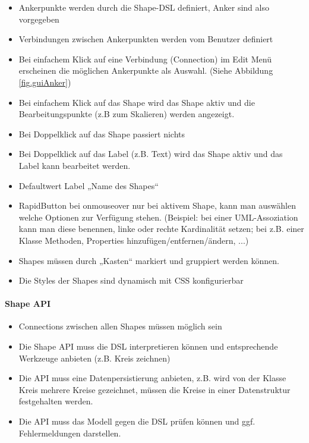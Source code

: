 \begin{itemize}
\begin{itemize}
    \end{itemize}
  \item Ankerpunkte werden durch die Shape-DSL definiert, Anker sind also vorgegeben
  \item Verbindungen zwischen Ankerpunkten werden vom Benutzer definiert
  \item Bei einfachem Klick auf eine Verbindung (Connection) im Edit Menü erscheinen die möglichen Ankerpunkte als Auswahl. (Siehe Abbildung \ref{fig.guiAnker})
  \item Bei einfachem Klick auf das Shape wird das Shape aktiv und die Bearbeitungspunkte (z.B zum Skalieren) werden angezeigt.
  \item Bei Doppelklick auf das Shape passiert nichts
  \item Bei Doppelklick auf das Label (z.B. Text) wird das Shape aktiv und das Label kann bearbeitet werden.
  \item Defaultwert Label „Name des Shapes“
  \item RapidButton bei onmouseover nur bei aktivem Shape, kann man auswählen welche Optionen zur Verfügung stehen. (Beispiel: bei einer UML-Assoziation kann man diese benennen, linke oder rechte Kardinalität setzen; bei z.B. einer Klasse Methoden, Properties hinzufügen/entfernen/ändern, ...)
  \item Shapes müssen durch „Kasten“ markiert und gruppiert werden können.
  \item Die Styles der Shapes sind dynamisch mit CSS konfigurierbar
\end{itemize}

\paragraph{Shape API}

\begin{itemize}
  \item Connections zwischen allen Shapes müssen möglich sein
  \item Die Shape API muss die DSL interpretieren können und entsprechende Werkzeuge anbieten (z.B. Kreis zeichnen)
  \item Die API muss eine Datenpersistierung anbieten, z.B. wird von der Klasse Kreis mehrere Kreise gezeichnet, müssen die Kreise in einer Datenstruktur festgehalten werden.
  \item Die API muss das Modell gegen die DSL prüfen können und ggf. Fehlermeldungen darstellen.
\end{itemize}

